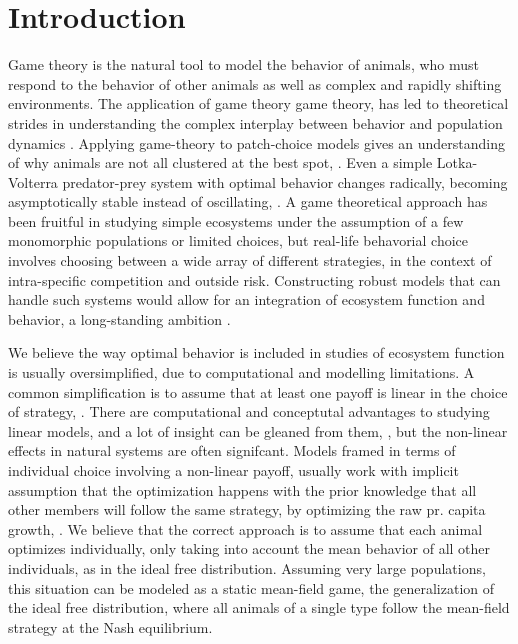 \section*{Introduction}

Game theory is the natural tool to model the behavior of animals, who must respond to the behavior of other animals as well as complex and rapidly shifting environments. The application of game theory game theory, has led to theoretical strides in understanding the complex interplay between behavior and population dynamics \cite{cressman2010}.  Applying game-theory to patch-choice models gives an understanding of why animals are not all clustered at the best spot, \citep{cressman2004ideal, abrams2007role}. Even a simple Lotka-Volterra predator-prey system with optimal behavior changes radically, becoming asymptotically stable instead of oscillating, \citep{kvrivan2007lotka}. A game theoretical approach has been fruitful in studying simple ecosystems under the assumption of a few monomorphic populations or limited choices, but real-life behavorial choice involves choosing between a wide array of different strategies, in the context of intra-specific competition and outside risk. Constructing robust models that can handle such systems would allow for an integration of ecosystem function and behavior, a long-standing ambition \citep{schmitz2008individuals}.

We believe the way optimal behavior is included in studies of ecosystem function is usually oversimplified, due to computational and modelling limitations. A common simplification is to assume that at least one payoff is linear in the choice of strategy, \citep{genkai2007macrophyte}. There are computational and conceptutal advantages to studying linear models, and a lot of insight can be gleaned from them, \citep{cressman2010}, but the non-linear effects in natural systems are often signifcant. Models framed in terms of individual choice involving a non-linear payoff, usually work with implicit assumption that the optimization happens with the prior knowledge that all other members will follow the same strategy, by optimizing the raw pr. capita growth, \citep{malone2020ecology,stump2017optimally}. We believe that the correct approach is to assume that each animal optimizes individually, only taking into account the mean behavior of all other individuals, as in the ideal free distribution. Assuming very large populations, this situation can be modeled as a static mean-field game, the generalization of the ideal free distribution, where all animals of a single type follow the mean-field strategy at the Nash equilibrium.

